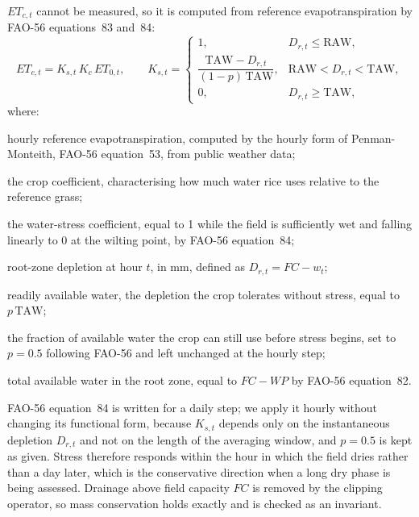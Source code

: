 $ET_{c,t}$ cannot be measured, so it is computed from reference
evapotranspiration by FAO-56 equations~83 and~84:
\begin{equation}
ET_{c,t}=K_{s,t}\,K_c\,ET_{0,t},
\qquad
K_{s,t}=\begin{cases}
1, & D_{r,t}\le\mathrm{RAW},\\
\dfrac{\mathrm{TAW}-D_{r,t}}{(1-p)\,\mathrm{TAW}},
  & \mathrm{RAW}<D_{r,t}<\mathrm{TAW},\\
0, & D_{r,t}\ge\mathrm{TAW},
\end{cases}
\label{eq:etc}
\end{equation}
where:
\begin{symbolist}
\item[$ET_{0,t}$] hourly reference evapotranspiration, computed by the hourly form
  of Penman-Monteith, FAO-56 equation~53, from public weather data;
\item[$K_c$] the crop coefficient, characterising how much water rice uses relative
  to the reference grass;
\item[$K_{s,t}$] the water-stress coefficient, equal to 1 while the field is
  sufficiently wet and falling linearly to 0 at the wilting point, by FAO-56
  equation~84;
\item[$D_{r,t}$] root-zone depletion at hour $t$, in mm, defined as
  $D_{r,t}=FC-w_t$;
\item[$\mathrm{RAW}$] readily available water, the depletion the crop
  tolerates without stress, equal to $p\,\mathrm{TAW}$;
\item[$p$] the fraction of available water the crop can still use before stress
  begins, set to $p=0.5$ following FAO-56 and left unchanged at the hourly step;
\item[$\mathrm{TAW}$] total available water in the root zone, equal to $FC-WP$ by
  FAO-56 equation~82.
\end{symbolist} FAO-56 equation~84 is written for a daily step; we apply it hourly without
changing its functional form, because $K_{s,t}$ depends only on the instantaneous
depletion $D_{r,t}$ and not on the length of the averaging window, and $p=0.5$ is
kept as given. Stress therefore responds within the hour in which the field dries
rather than a day later, which is the conservative direction when a long dry phase
is being assessed.
Drainage above field capacity $FC$ is removed by the clipping operator, so mass
conservation holds exactly and is checked as an invariant.

